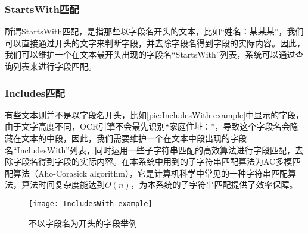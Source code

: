 \subsubsection*{StartsWith匹配}
所谓StartsWith匹配，是指那些以字段名开头的文本，比如“姓名：某某某”，我们可以直接通过开头的文字来判断字段，并去除字段名得到字段的实际内容。因此，我们可以维护一个在文本最开头出现的字段名“StartsWith”列表，系统可以通过查询列表来进行字段匹配。
\subsubsection*{Includes匹配}
有些文本则并不是以字段名开头，比如\autoref{pic:IncludesWith-example}中显示的字段，由于文字高度不同，OCR引擎不会最先识别“家庭住址：”，导致这个字段名会隐藏在文本的中段，因此，我们需要维护一个在文本中段出现的字段名“IncludesWith”列表，同时运用一些子字符串匹配的高效算法进行字段匹配，去除字段名得到字段的实际内容。在本系统中用到的子字符串匹配算法为AC多模匹配算法（Aho-Corasick algorithm）\citep{aho1975efficient}，它是计算机科学中常见的一种字符串匹配算法，算法时间复杂度能达到$O(n)$，为本系统的子字符串匹配提供了效率保障。
\begin{figure}
	\centering
	\texttt{[image: IncludesWith-example]}
	\caption{不以字段名为开头的字段举例}
	\label{pic:IncludesWith-example}
\end{figure}


